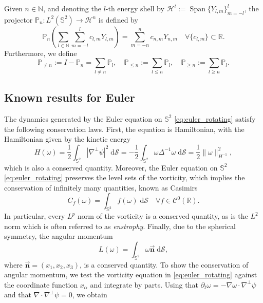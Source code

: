 \documentclass{amsart}
\def\erre{{\mathbb{R}}}
\def\enne{{\mathbb{N}}}
\def\esse{{\mathbb{S}}}
\begin{document}
Given $n\in\enne$, and denoting the $l$-th energy shell by $\mathcal{H}^l:=\operatorname{Span}\{Y_{l,m}\}_{m=-l}^l$, the projector $\mathbb{P}_n:L^2(\esse^2)\to\mathcal{H}^n$ is defined by
\begin{equation*}
    \mathbb{P}_n\left(\sum_{l\in\enne}\sum_{m=-l}^lc_{l,m}Y_{l,m}\right)=\sum_{m=-n}^nc_{n,m}Y_{n,m}\quad\forall\{c_{l,m}\}\subset\erre.
\end{equation*}
Furthermore, we define
\begin{equation*}
    \mathbb{P}_{\neq n}:=I-\mathbb{P}_n=\sum_{l\neq n}\mathbb{P}_l,\quad\mathbb{P}_{\leq n}:=\sum_{l\leq n}\mathbb{P}_l,\quad\mathbb{P}_{\geq n}:=\sum_{l\geq n}\mathbb{P}_l.
\end{equation*}



\subsection{Known results for Euler} \label{subsec:known_results_euler}
The dynamics generated by the Euler equation on $\esse^2$ \eqref{eq:euler_rotating} satisfy the following conservation laws.
First, the equation is Hamiltonian, with the Hamiltonian given by the kinetic energy
\begin{equation}
    H(\omega)=\frac{1}{2}\int_{\esse^2}|\nabla^\perp \psi|^2\;\mathrm{d}\mathcal{S}=-\frac{1}{2}\int_{\esse^2}\omega\Delta^{-1}\omega\;\mathrm{d}\mathcal{S}=\frac{1}{2}\|\omega\|^2_{H^{-1}},
    \label{eq:energy}
\end{equation}
which is also a conserved quantity. Moreover, the Euler equation on $\esse^2$ \eqref{eq:euler_rotating} preserves the level sets of the vorticity, which implies the conservation of infinitely many quantities, known as Casimirs
\begin{equation}
    C_f(\omega)=\int_{\esse^2}f(\omega)\;\mathrm{d}\mathcal{S}\quad\forall f\in\mathcal{C}^0(\erre).
    \label{eq:Casimirs}
\end{equation}
In particular, every $L^p$ norm of the vorticity is a conserved quantity, as is the $L^2$ norm which is often referred to as \textit{enstrophy}. Finally, due to the spherical symmetry, the angular momentum
\begin{equation}
    L(\omega)=\int_{\esse^2}\omega\vec{\boldsymbol{n}}\;\mathrm{d}\mathcal{S},
    \label{eq:cons_ang_mom}
\end{equation}
where $\vec{\boldsymbol{n}}=(x_1,x_2,x_3)$, is a conserved quantity. To show the conservation of angular momentum, we test the vorticity equation in \eqref{eq:euler_rotating} against the coordinate function $x_\alpha$ and integrate by parts. Using that $\partial_t \omega = - \nabla \omega \cdot \nabla^\perp \psi$ and that $\nabla \cdot \nabla^\perp \psi = 0$, we obtain
\end{document}
